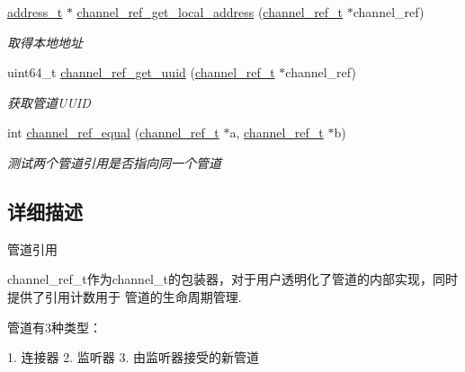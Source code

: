 \begin{DoxyCompactItemize}
\hyperlink{a00044_a7a6e75b85c8b441f843bd40004a7d9d5_a7a6e75b85c8b441f843bd40004a7d9d5}{address\+\_\+t} $\ast$ \hyperlink{a00084_ga1dcf6af0c992fa21f9dcd03c8f763ec4_ga1dcf6af0c992fa21f9dcd03c8f763ec4}{channel\+\_\+ref\+\_\+get\+\_\+local\+\_\+address} (\hyperlink{a00044_a151271c9d188ef28d4d24bb81dcc1263_a151271c9d188ef28d4d24bb81dcc1263}{channel\+\_\+ref\+\_\+t} $\ast$channel\+\_\+ref)
\begin{DoxyCompactList}\small\item\em 取得本地地址 \end{DoxyCompactList}\item 
uint64\+\_\+t \hyperlink{a00084_ga3fd39b821fef38abd518db6240e79068_ga3fd39b821fef38abd518db6240e79068}{channel\+\_\+ref\+\_\+get\+\_\+uuid} (\hyperlink{a00044_a151271c9d188ef28d4d24bb81dcc1263_a151271c9d188ef28d4d24bb81dcc1263}{channel\+\_\+ref\+\_\+t} $\ast$channel\+\_\+ref)
\begin{DoxyCompactList}\small\item\em 获取管道\+U\+U\+I\+D \end{DoxyCompactList}\item 
int \hyperlink{a00084_gad44fcb68845cb3ebb582a9de6db9abd0_gad44fcb68845cb3ebb582a9de6db9abd0}{channel\+\_\+ref\+\_\+equal} (\hyperlink{a00044_a151271c9d188ef28d4d24bb81dcc1263_a151271c9d188ef28d4d24bb81dcc1263}{channel\+\_\+ref\+\_\+t} $\ast$a, \hyperlink{a00044_a151271c9d188ef28d4d24bb81dcc1263_a151271c9d188ef28d4d24bb81dcc1263}{channel\+\_\+ref\+\_\+t} $\ast$b)
\begin{DoxyCompactList}\small\item\em 测试两个管道引用是否指向同一个管道 \end{DoxyCompactList}\end{DoxyCompactItemize}


\subsection{详细描述}
管道引用 


\begin{DoxyPre}
channel\_ref\_t作为channel\_t的包装器，对于用户透明化了管道的内部实现，同时提供了引用计数用于
管道的生命周期管理.\end{DoxyPre}



\begin{DoxyPre}管道有3种类型：\end{DoxyPre}



\begin{DoxyPre}1. 连接器
2. 监听器
3. 由监听器接受的新管道\end{DoxyPre}



